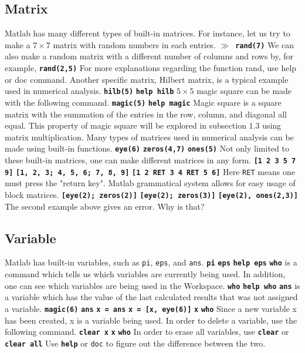 \subsection{Matrix}
Matlab has many different types of built-in matrices. For instance, let us try to make a $7 \times 7$ matrix with random numbers in each entries. \vv \texttt{\textbf{$\gg$ rand(7)}} \vn We can also make a random matrix with a different number of columns and rows by, for example, \matlabp\texttt{\textbf{rand(2,5)}} \vn For more explanations regarding the function rand, use help or doc command. Another specific matrix, Hilbert matrix, is a typical example used in numerical analysis. \matlabp\texttt{\textbf{hilb(5)}} \matlabp\texttt{\textbf{help hilb}} \vn $5 \times 5$ magic square can be made with the following command. \matlabp\texttt{\textbf{magic(5)}} \matlabp\texttt{\textbf{help magic}} \vn Magic square is a square matrix with the summation of the entries in the row, column, and diagonal all equal. This property of magic square will be explored in subsection 1.3 %
 using matrix multiplication. Many types of matrices used in numerical analysis can be made using built-in functions. \matlabp\texttt{\textbf{eye(6)}} \matlabp\texttt{\textbf{zeros(4,7)}} \matlabp\texttt{\textbf{ones(5)}} \vn Not only limited to these built-in matrices, one can make different matrices in any form. \matlabp\texttt{\textbf{[1 2 3 5 7 9]}} \matlabp\texttt{\textbf{[1, 2, 3; 4, 5, 6; 7, 8, 9]}} \matlabp\texttt{\textbf{[1 2 RET 3 4 RET 5 6]}} \vn Here {\tt RET} means one must press the "return key". Matlab grammatical system allows for easy usage of block matrices. \matlabp\texttt{\textbf{[eye(2); zeros(2)]}} \matlabp\texttt{\textbf{[eye(2); zeros(3)]}} \matlabp\texttt{\textbf{[eye(2), ones(2,3)]}} \vn The second example above gives an error. Why is that?

\subsection{Variable}
Matlab has built-in variables, such as {\tt pi}, {\tt eps}, and {\tt ans}. \matlabp\texttt{\textbf{pi}} \matlabp\texttt{\textbf{eps}} \matlabp\texttt{\textbf{help eps}} \vn \texttt{\textbf{who}} is a command which tells us which variables are currently being used. In addition, one can see which variables are being used in the Workspace. \matlabp\texttt{\textbf{who}} \matlabp\texttt{\textbf{help who}} \vn \texttt{\textbf{ans}} is a variable which has the value of the last calculated results that was not assigned a variable. \matlabp\texttt{\textbf{magic(6)}} \matlabp\texttt{\textbf{ans}} \matlabp\texttt{\textbf{x = ans}} \matlabp\texttt{\textbf{x = [x, eye(6)]}} \matlabp\texttt{\textbf{x}} \matlabp\texttt{\textbf{who}} \vn Since a new variable x has been created, x is a variable being used. In order to delete a variable, use the following command. \matlabp\texttt{\textbf{clear x}} \matlabp\texttt{\textbf{x}} \matlabp\texttt{\textbf{who}} \vn In order to erase all variables, use \matlabp\texttt{\textbf{clear}} \vn or \matlabp\texttt{\textbf{clear all}} \vn Use \texttt{\textbf{help}} or {\tt doc} to figure out the difference between the two.

